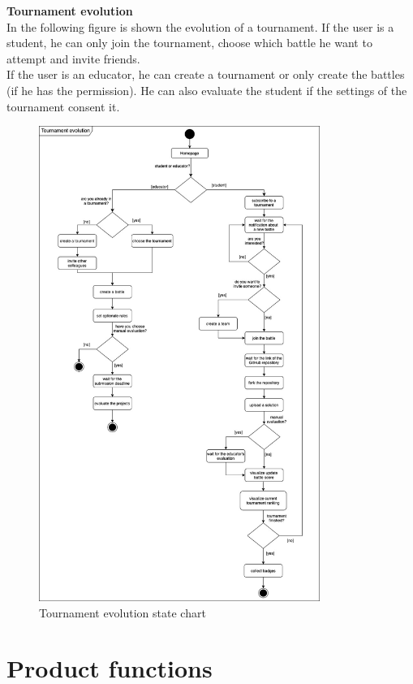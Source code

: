 \clearpage
\textbf{Tournament evolution}\\
In the following figure is shown the evolution of a tournament. If the user is a student, he can only join
the tournament, choose which battle he want to attempt and invite friends.\\ If the user is an educator, he
can create a tournament or only create the battles (if he has the permission). He can also evaluate 
the student if the settings of the tournament consent it.
\begin{figure} [H]
  \centering
  \includegraphics[width=0.815\textwidth]{images/state_diagrams/Tournament_evolution.jpg}
  \caption{Tournament evolution state chart}
\end{figure} \vspace{1cm}

\section{Product functions}
